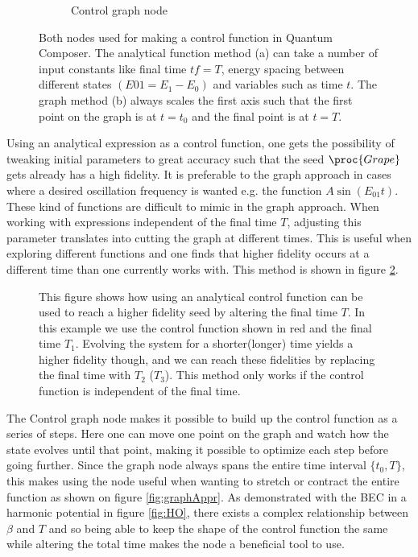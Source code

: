 \documentclass[a4paper, twocolumn]{revtex4-1}
\begin{document}
\begin{figure}[h]
\begin{subfigure}[b]{0.45\columnwidth}
		\caption{Control graph node}
	\end{subfigure}
	\caption{Both nodes used for making a control function in Quantum Composer. The analytical function method (a) can take a number of input constants like final time $tf = T$, energy spacing between different states $(E01 = E_1 - E_0)$ and variables such as time $t$. The graph method (b) always scales the first axis such that the first point on the graph is at $t=t_0$ and the final point is at $t=T$.}
	\label{fig:Controls}
\end{figure}

Using an analytical expression as a control function, one gets the possibility of tweaking initial parameters to great accuracy such that the seed $\proc{Grape}$ gets already has a high fidelity. It is preferable to the graph approach in cases where a desired oscillation frequency is wanted e.g. the function $A\sin(E_{01}t)$. These kind of functions are difficult to mimic in the graph approach. When working with expressions independent of the final time $T$, adjusting this parameter translates into cutting the graph at different times. This is useful when exploring different functions and one finds that higher fidelity occurs at a different time than one currently works with. This method is shown in figure \ref{fig:funcAppr}. \\
\begin{figure}
	\def\svgwidth{\columnwidth}
	
	\caption{This figure shows how using an analytical control function can be used to reach a higher fidelity seed by altering the final time $T$. In this example we use the control function shown in red and the final time $T_1$. Evolving the system for a shorter(longer) time yields a higher fidelity though, and we can reach these fidelities by replacing the final time with $T_2$ ($T_3$). This method only works if the control function is independent of the final time.}
	\label{fig:funcAppr}
\end{figure}

The Control graph node makes it possible to build up the control function as a series of steps. Here one can move one point on the graph and watch how the state evolves until that point, making it possible to optimize each step before going further. Since the graph node always spans the entire time interval $\{t_0,T\}$, this makes using the node useful when wanting to stretch or contract the entire function as shown on figure \ref{fig:graphAppr}. As demonstrated with the BEC in a harmonic potential in figure \ref{fig:HO}, there exists a complex relationship between $\beta$ and $T$ and so being able to keep the shape of the control function the same while altering the total time makes the node a beneficial tool to use.\\
\end{document}
